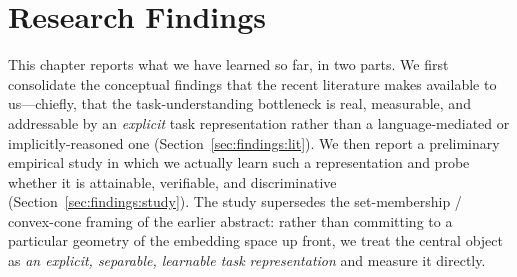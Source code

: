 %
%

\section{Research Findings}
\label{sec:findings}

This chapter reports what we have learned so far, in two parts. We first
consolidate the conceptual findings that the recent literature makes available
to us---chiefly, that the task-understanding bottleneck is real, measurable, and
addressable by an \emph{explicit} task representation rather than a
language-mediated or implicitly-reasoned one (Section~\ref{sec:findings:lit}).
We then report a preliminary empirical study in which we actually learn such a
representation and probe whether it is attainable, verifiable, and
discriminative (Section~\ref{sec:findings:study}). The study supersedes the
set-membership / convex-cone framing of the earlier abstract: rather than
committing to a particular geometry of the embedding space up front, we treat
the central object as \emph{an explicit, separable, learnable task
representation} and measure it directly.


